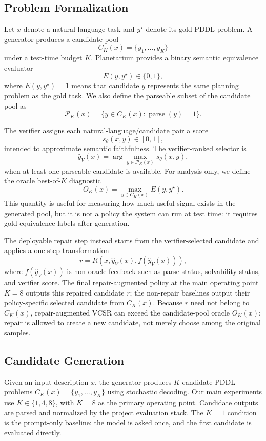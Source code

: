 \documentclass[11pt]{article}
\newcommand{\vcsr}{\textsc{VCSR}\xspace}
\newcommand{\pddl}{\textsc{PDDL}\xspace}
\begin{document}
\subsection{Problem Formalization}

Let \(x\) denote a natural-language task and \(y^\star\) denote its gold
\pddl problem. A generator produces a candidate pool
\[
C_K(x) = \{y_1,\ldots,y_K\}
\]
under a test-time budget \(K\). Planetarium provides a binary semantic
equivalence evaluator
\[
E(y,y^\star) \in \{0,1\},
\]
where \(E(y,y^\star)=1\) means that candidate \(y\) represents the same planning
problem as the gold task. We also define the parseable subset of the candidate
pool as
\[
\mathcal{P}_K(x) = \{y \in C_K(x) : \operatorname{parse}(y)=1\}.
\]

The verifier assigns each natural-language/candidate pair a score
\[
s_\theta(x,y) \in [0,1],
\]
intended to approximate semantic faithfulness. The verifier-ranked selector is
\[
\hat{y}_V(x) = \arg\max_{y \in \mathcal{P}_K(x)} s_\theta(x,y),
\]
when at least one parseable candidate is available. For analysis only, we define
the oracle best-of-\(K\) diagnostic
\[
O_K(x) = \max_{y \in C_K(x)} E(y,y^\star).
\]
This quantity is useful for measuring how much useful signal exists in the
generated pool, but it is not a policy the system can run at test time: it
requires gold equivalence labels after generation.

The deployable repair step instead starts from the verifier-selected candidate
and applies a one-step transformation
\[
r = R\!\left(x, \hat{y}_V(x), f(\hat{y}_V(x))\right),
\]
where \(f(\hat{y}_V(x))\) is non-oracle feedback such as parse status,
solvability status, and verifier score. The final repair-augmented policy at
the main operating point \(K=8\) outputs this repaired candidate \(r\); the
non-repair baselines output their policy-specific selected candidate from
\(C_K(x)\). Because \(r\) need not belong to \(C_K(x)\), repair-augmented
\vcsr can exceed the candidate-pool oracle \(O_K(x)\): repair is allowed to
create a new candidate, not merely choose among the original samples.

\subsection{Candidate Generation}

Given an input description $x$, the generator produces $K$ candidate \pddl
problems \(C_K(x)=\{y_1,\ldots,y_K\}\) using stochastic decoding. Our main
experiments use $K \in \{1,4,8\}$, with $K=8$ as the primary operating point.
Candidate outputs are parsed and normalized by the project evaluation stack.
The $K=1$ condition is the prompt-only baseline: the model is asked once, and
the first candidate is evaluated directly.
\end{document}
